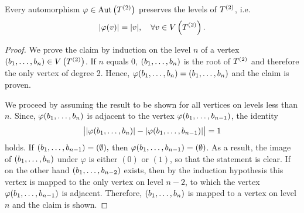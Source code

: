 \begin{thm}\label{thm:Levels are preserved}
Every automorphism $\varphi\in\AutT$ preserves the levels of $\T$, i.e.
\begin{equation*}
\lvert \varphi(v)\rvert=\lvert v\rvert,\quad\forall v\in\VT.
\end{equation*}
\end{thm}

\begin{proof}
We prove the claim by induction on the level $n$ of a vertex $(\seq{b})\in\VT$. If $n$ equals 0, $(\seq{b})$ is the root of $\T$ and therefore the only vertex of degree 2. Hence, $\varphi(\seq{b})=(\seq{b})$ and the claim is proven.

We proceed by assuming the result to be shown for all vertices on levels less than $n$. Since, $\varphi(\seq{b})$ is adjacent to the vertex $\varphi(\seq[n-1]{b})$, the identity
\begin{equation*}
\big\lvert\lvert\varphi(\seq{b})\rvert-\lvert\varphi(\seq[n-1]{b})\rvert\big\rvert=1
\end{equation*}
holds. If $(\seq[n-1]{b})=(\emptyset),$ then $\varphi(\seq[n-1]{b})=(\emptyset)$. As a result, the image of $(\seq{b})$ under $\varphi$ is either $(0)$ or $(1)$, so that the statement is clear. If on the other hand $(\seq[n-2]{b})$ exists, then by the induction hypothesis this vertex is mapped  to the only vertex on level $n-2$, to which the vertex $\varphi(\seq[n-1]{b})$ is adjacent. Therefore, $(\seq{b})$ is mapped to a vertex on level $n$ and the claim is shown.
\end{proof}

